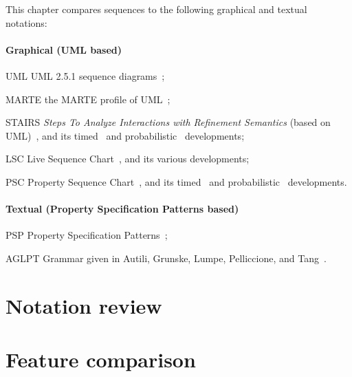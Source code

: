 
This chapter compares \langname{} sequences to the following graphical
and textual notations:

\newcommand{\featname}[1]{\textsf{#1}}

\paragraph{Graphical (UML based)}

\begin{featset}
\item[UML] UML 2.5.1 sequence diagrams~\cite{uml251};
\item[MARTE] the MARTE profile of UML~\cite{marte12};
\item[STAIRS] \emph{Steps To Analyze Interactions with Refinement Semantics} (based on UML)~\cite{Haugen03-STAIRS},
and its timed~\cite{Haugen05-TimedSTAIRS} and
probabilistic~\cite{Refsdal05-ProbabilisticSTAIRS} developments;
\item[LSC] Live Sequence Chart~\cite{lsc}, and its
various developments;
\item[PSC] Property Sequence Chart~\cite{psc}, and its
timed~\cite{tpsc} and probabilistic~\cite{ptpsc} developments.
\end{featset}

\paragraph{Textual (Property Specification Patterns based)}

\begin{featset}
\item[PSP] Property Specification Patterns~\cite{psp,pspsite};
\item[AGLPT] Grammar given in Autili, Grunske, Lumpe, Pelliccione, and Tang~\cite{aglpt}.
\end{featset}

\section{Notation review}\label{sec:seq-comparison-review}


\section{Feature comparison}\label{sec:seq-comparison-features}


